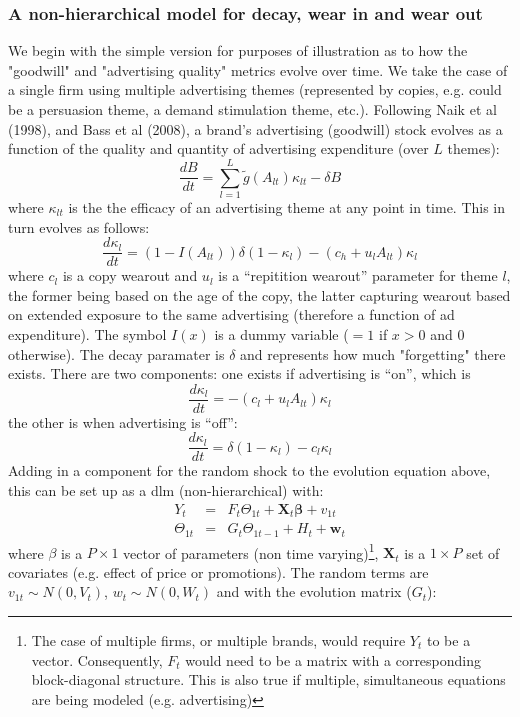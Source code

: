 \documentclass[11pt]{article} %
\begin{document}
\subsubsection{A non-hierarchical model for decay, wear in and wear out}
We begin with the simple version for purposes of illustration as to how
the "goodwill" and "advertising quality" metrics evolve over time.
We take the case of a single firm using multiple advertising themes (represented by copies, e.g. could be a 
persuasion theme, a demand stimulation theme, etc.).  
Following Naik et al (1998), and Bass et al (2008), a brand's advertising (goodwill) stock  evolves as a function of the quality
and quantity of advertising expenditure (over $L$ themes):
\[
\frac{dB}{dt} = \sum_{l=1}^L \tilde{g}(A_{lt}) \kappa_{lt} - \delta B
\]
where $\kappa_{lt}$ is the the efficacy of an advertising theme at any point in time.  This in turn evolves as follows:
\[
\frac{d\kappa_l}{dt} = (1-I(A_{lt}))\delta(1-\kappa_l)-(c_h + u_l A_{lt}) \kappa_l 
\]
where $c_l$ is a copy wearout and $u_l$ is a ``repitition wearout'' parameter for theme $l$, the former being based on the age
of the copy, the latter capturing wearout based on extended exposure to the same advertising (therefore a function of ad expenditure).  
The symbol $I(x)$ is a dummy variable ($=1$ if $x>0$ and $0$ otherwise).  The decay paramater is $\delta$ and
represents how much "forgetting" there exists.   There are two components: one exists if advertising is ``on'', which is 
\[
\frac{d\kappa_l}{dt} = -(c_l+ u_l A_{lt}) \kappa_l
\]
the other is when advertising is ``off'':
\[
\frac{d\kappa_l}{dt} = \delta(1-\kappa_l)- c_l \kappa_l 
\]
Adding in a component for the random shock to the evolution equation above, this can be set up as a dlm (non-hierarchical) with:
\begin{eqnarray}
\label{eqn:dlm1}
Y_t & = & F_t \Theta_{1t} +  \mathbf{X}_{t} \mathbf{\beta} +  v_{1t}\nonumber\\
\Theta_{1t} & = & G_t \Theta_{1t-1} + H_t + \mathbf{w}_t
\end{eqnarray}
where $\beta$ is a $P \times 1$ vector of parameters (non time varying)\footnote{The case of multiple 
firms, or multiple brands, would require $Y_t$ to be a vector.  Consequently, $F_t$ would need to be a 
matrix with a corresponding block-diagonal structure.  This is also true if multiple, simultaneous
equations are being modeled (e.g. advertising)}, $\mathbf{X}_t$ is a $1\times P$ set of covariates (e.g. effect of price or promotions).  
The random terms are $v_{1t} \sim N(0,V_t)$,  $w_t \sim N(0,W_t)$ and with the evolution matrix ($G_t$):
\end{document}
